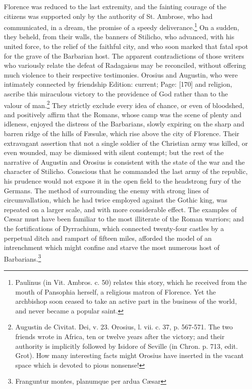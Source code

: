 Florence was reduced to the last extremity, and the fainting courage of the citizens was supported only by the authority of St. Ambrose, who had communicated, in a dream, the promise of a speedy deliverance.\footnote{Paulinus (in Vit. Ambros. c. 50) relates this story, which he received from the mouth of Pansophia herself, a religious matron of Florence. Yet the archbishop soon ceased to take an active part in the business of the world, and never became a popular saint.} On a sudden, they beheld, from their walls, the banners of Stilicho, who advanced, with his united force, to the relief of the faithful city, and who soon marked that fatal spot for the grave of the Barbarian host. The apparent contradictions of those writers who variously relate the defeat of Radagaisus may be reconciled, without offering much violence to their respective testimonies. Orosius and Augustin, who were intimately connected by friendship Edition: current; Page: [170] and religion, ascribe this miraculous victory to the providence of God rather than to the valour of man.\footnote{Augustin de Civitat. Dei, v. 23. Orosius, l. vii. c. 37, p. 567-571. The two friends wrote in Africa, ten or twelve years after the victory; and their authority is implicitly followed by Isidore of Seville (in Chron. p. 713, edit. Grot). How many interesting facts might Orosius have inserted in the vacant space which is devoted to pious nonsense!} They strictly exclude every idea of chance, or even of bloodshed, and positively affirm that the Romans, whose camp was the scene of plenty and idleness, enjoyed the distress of the Barbarians, slowly expiring on the sharp and barren ridge of the hills of Fæsulæ, which rise above the city of Florence. Their extravagant assertion that not a single soldier of the Christian army was killed, or even wounded, may be dismissed with silent contempt; but the rest of the narrative of Augustin and Orosius is consistent with the state of the war and the character of Stilicho. Conscious that he commanded the last army of the republic, his prudence would not expose it in the open field to the headstrong fury of the Germans. The method of surrounding the enemy with strong lines of circumvallation, which he had twice employed against the Gothic king, was repeated on a larger scale, and with more considerable effect. The examples of Cæsar must have been familiar to the most illiterate of the Roman warriors; and the fortifications of Dyrrachium, which connected twenty-four castles by a perpetual ditch and rampart of fifteen miles, afforded the model of an intrenchment which might confine and starve the most numerous host of Barbarians.\footnote{Franguntur montes, planumque per ardua Cæsar

}
